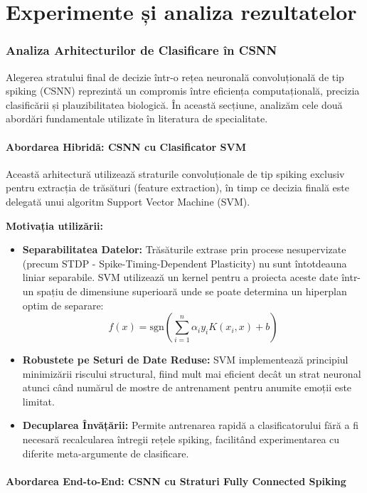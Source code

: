 \chapter{Experimente și analiza rezultatelor}

\subsection{Analiza Arhitecturilor de Clasificare în CSNN}

Alegerea stratului final de decizie într-o rețea neuronală convoluțională de tip spiking (CSNN) reprezintă un compromis între eficiența computațională, precizia clasificării și plauzibilitatea biologică. În această secțiune, analizăm cele două abordări fundamentale utilizate în literatura de specialitate.

\subsubsection{Abordarea Hibridă: CSNN cu Clasificator SVM}

Această arhitectură utilizează straturile convoluționale de tip spiking exclusiv pentru extracția de trăsături (feature extraction), în timp ce decizia finală este delegată unui algoritm Support Vector Machine (SVM).

\textbf{Motivația utilizării:}
\begin{itemize}
    \item \textbf{Separabilitatea Datelor:} Trăsăturile extrase prin procese nesupervizate (precum STDP - Spike-Timing-Dependent Plasticity) nu sunt întotdeauna liniar separabile. SVM utilizează un kernel pentru a proiecta aceste date într-un spațiu de dimensiune superioară unde se poate determina un hiperplan optim de separare:
    \[ f(x) = \text{sgn} \left( \sum_{i=1}^{n} \alpha_i y_i K(x_i, x) + b \right) \]
    \item \textbf{Robustete pe Seturi de Date Reduse:} SVM implementează principiul minimizării riscului structural, fiind mult mai eficient decât un strat neuronal atunci când numărul de mostre de antrenament pentru anumite emoții este limitat.
    \item \textbf{Decuplarea Învățării:} Permite antrenarea rapidă a clasificatorului fără a fi necesară recalcularea întregii rețele spiking, facilitând experimentarea cu diferite meta-argumente de clasificare.
\end{itemize}

\subsubsection{Abordarea End-to-End: CSNN cu Straturi Fully Connected Spiking}

